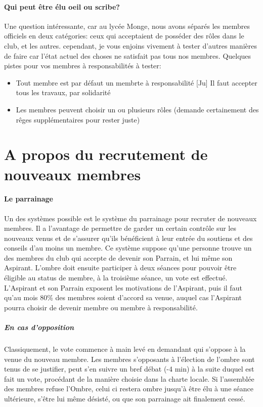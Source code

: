 \documentclass[a4paper,12pt]{article}
\begin{document}
\paragraph{Qui peut être élu oeil ou scribe?}
Une question intéressante, car au lycée Monge, nous avons séparés les membres officiels en deux catégories: ceux qui acceptaient de posséder des rôles dans le club, et les autres. cependant, je vous enjoins vivement à tester d'autres manières de faire car l'état actuel des choses ne satisfait pas tous nos membres. Quelques pistes pour vos membres à responsabilités à tester:
\begin{itemize}
 \item Tout membre est par défaut un membrte à responsabilité [Ju] Il faut accepter tous les travaux, par solidarité
 \item Les membres peuvent choisir un ou plusieurs rôles (demande certainement des rêges supplémentaires pour rester juste)
\end{itemize}

\section{A propos du recrutement de nouveaux membres}
\paragraph{Le parrainage}
Un des systèmes possible est le système du parrainage pour recruter de nouveaux membres. Il a l'avantage de permettre de garder un certain contrôle sur les nouveaux venus et de s'assurer qu'ils bénéficient à leur entrée du soutiens et des conseils d'au moins un membre. Ce système suppose qu'une personne trouve un des membres du club qui accepte de devenir son Parrain, et lui même son Aspirant. L'ombre doit ensuite participer à deux séances pour pouvoir être éligible au status de membre, à la troisième séance, un vote est effectué. L'Aspirant et son Parrain exposent les motivations de l'Aspirant, puis il faut qu'au mois 80\% des membres soient d'accord sa venue, auquel cas l'Aspirant pourra choisir de devenir membre ou membre à responsabilité.
\subparagraph{En cas d'opposition}
Classiquement, le vote commence à main levé en demandant qui s'oppose à la venue du nouveau membre. Les membres s'opposants à l'élection de l'ombre sont tenus de se justifier, peut s'en suivre un bref débat (-4 min) à la suite duquel est fait un vote, procédant de la manière choisie dans la charte locale. Si l'assemblée des membres refuse l'Ombre, celui ci restera ombre jusqu'à être élu à une séance ultérieure, s'être lui même désisté, ou que son parrainage ait finalement cessé.
\end{document}

